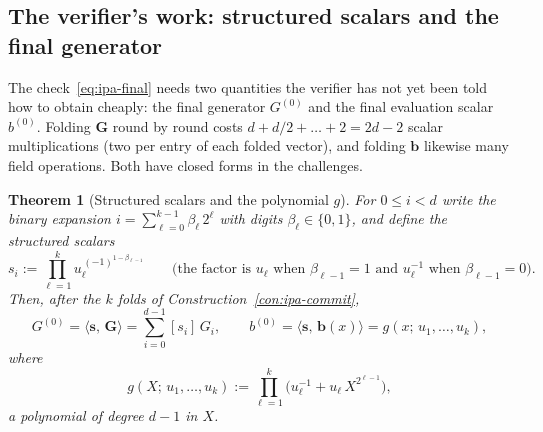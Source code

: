 \documentclass[11pt,a4paper]{article}
\newtheorem{theorem}{Theorem}[section]
\theoremstyle{definition}
\newcommand{\ip}[2]{\langle #1,\, #2 \rangle}
\begin{document}
\subsection{The verifier's work: structured scalars and the final
  generator}
\label{sec:ipa-verifier}

The check~\eqref{eq:ipa-final} needs two quantities the verifier has
not yet been told how to obtain cheaply: the final generator
$G^{(0)}$ and the final evaluation scalar $b^{(0)}$. Folding
$\mathbf G$ round by round costs $d + d/2 + \dots + 2 = 2d - 2$ scalar
multiplications (two per entry of each folded vector), and folding
$\mathbf b$ likewise many field operations. Both have closed forms in
the challenges.

\begin{theorem}[Structured scalars and the polynomial $g$]
\label{thm:ipa-structured}
For $0 \le i < d$ write the binary expansion
$i = \sum_{\ell=0}^{k-1} \beta_\ell\,2^{\ell}$ with digits
$\beta_\ell \in \{0, 1\}$, and define the \emph{structured scalars}
\begin{equation}\label{eq:ipa-s}
s_i := \prod_{\ell=1}^{k} u_\ell^{\,(-1)^{1 - \beta_{\ell-1}}}
  \qquad\text{(the factor is $u_\ell$ when } \beta_{\ell-1} = 1
  \text{ and } u_\ell^{-1} \text{ when } \beta_{\ell-1} = 0\text{)}.
\end{equation}
Then, after the $k$ folds of Construction~\ref{con:ipa-commit},
\begin{equation}\label{eq:ipa-closed}
G^{(0)} = \ip{\mathbf s}{\mathbf G} = \sum_{i=0}^{d-1} [s_i]\,G_i,
\qquad
b^{(0)} = \ip{\mathbf s}{\mathbf b(x)} = g(x;\, u_1, \dots, u_k),
\end{equation}
where
\begin{equation}\label{eq:ipa-g}
g(X;\, u_1, \dots, u_k) := \prod_{\ell=1}^{k}
  \bigl(u_\ell^{-1} + u_\ell\,X^{2^{\ell-1}}\bigr),
\end{equation}
a polynomial of degree $d - 1$ in $X$.
\end{theorem}
\end{document}
